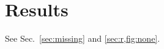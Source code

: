 \documentclass{article}
\begin{document}
\section{Results}\label{sec:r} See Sec.~\ref{sec:missing} and \cref{sec:r,fig:none}.
\end{document}
